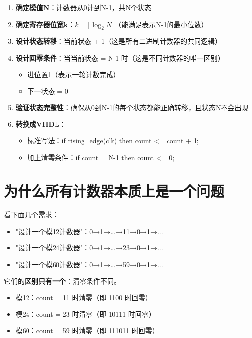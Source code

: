 \begin{designflow}
\begin{enumerate}
  \item \textbf{确定模值N}：计数器从0计到N-1，共N个状态
  \item \textbf{确定寄存器位宽k}：$k = \lceil \log_2 N \rceil$（能满足表示N-1的最小位数）
  \item \textbf{设计状态转移}：当前状态 + 1（这是所有二进制计数器的共同逻辑）
  \item \textbf{设计回零条件}：当当前状态 = N-1 时（这是不同计数器的唯一区别）
    \begin{itemize}
      \item 进位置1（表示一轮计数完成）
      \item 下一状态 = 0
    \end{itemize}
  \item \textbf{验证状态完整性}：确保从0到N-1的每个状态都能正确转移，且状态N不会出现
  \item \textbf{转换成VHDL}：
    \begin{itemize}
      \item 标准写法：if rising\_edge(clk) then count <= count + 1;
      \item 加上清零条件：if count = N-1 then count <= 0;
    \end{itemize}
  \end{enumerate}
\end{designflow}

\section{为什么所有计数器本质上是一个问题}

看下面几个需求：
\begin{itemize}
  \item "设计一个模12计数器"：0→1→...→11→0→1→...
  \item "设计一个模24计数器"：0→1→...→23→0→1→...
  \item "设计一个模60计数器"：0→1→...→59→0→1→...
\end{itemize}

它们的\textbf{区别只有一个}：清零条件不同。

\begin{itemize}
  \item 模12：count = 11 时清零（即 1100 时回零）
  \item 模24：count = 23 时清零（即 10111 时回零）
  \item 模60：count = 59 时清零（即 111011 时回零）
\end{itemize}

